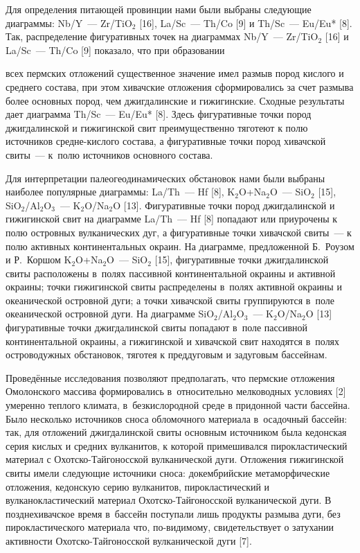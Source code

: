 Для определения питающей провинции нами были выбраны следующие диаграммы: Nb/Y~--- Zr/TiO$_2$ [16], La/Sc~--- Th/Co [9] и Th/Sc~--- Eu/Eu* [8]. Так, распределение фигуративных точек на диаграммах Nb/Y~--- Zr/TiO$_2$ [16] и La/Sc~--- Th/Co [9] показало, что при образовании

всех пермских отложений существенное значение имел размыв пород кислого и среднего состава, при этом хивачские отложения сформировались за счет размыва более основных пород, чем джигдалинские и гижигинские. Сходные результаты дает диаграмма Th/Sc~--- Eu/Eu* [8]. Здесь фигуративные точки пород джигдалинской и гижигинской свит преимущественно тяготеют к полю источников средне-кислого состава, а фигуративные точки пород хивачской свиты~--- к~полю источников основного состава.

Для интерпретации палеогеодинамических обстановок нами были выбраны наиболее популярные диаграммы: La/Th~--- Hf [8], K$_2$O+Na$_2$O~--- SiO$_2$ [15], SiO$_2$/Al$_2$O$_3$~--- K$_2$O/Na$_2$O [13]. Фигуративные точки пород джигдалинской и гижигинской свит на диаграмме La/Th~--- Hf [8] попадают или приурочены к полю островных вулканических дуг, а фигуративные точки хивачской свиты~--- к полю активных континентальных окраин. На диаграмме, предложенной Б.~Роузом и Р.~Коршом K$_2$O+Na$_2$O~--- SiO$_2$ [15], фигуративные точки джигдалинской свиты расположены в~полях пассивной континентальной окраины и активной окраины; точки гижигинской свиты распределены в~полях активной окраины и океанической островной дуги; а точки хивачской свиты группируются в~поле океанической островной дуги. На диаграмме SiO$_2$/Al$_2$O$_3$~--- K$_2$O/Na$_2$O [13] фигуративные точки джигдалинской свиты попадают в~поле пассивной континентальной окраины, а гижигинской и хивачской свит находятся в~полях островодужных обстановок, тяготея к преддуговым и задуговым бассейнам.

Проведённые исследования позволяют предполагать, что пермские отложения Омолонского массива формировались в~относительно мелководных условиях [2] умеренно теплого климата, в~безкислородной среде в придонной части
бассейна. Было несколько источников сноса обломочного материала в~осадочный бассейн: так, для отложений джигдалинской свиты основным источником была кедонская серия кислых и средних вулканитов, к которой примешивался пирокластический материал с Охотско-Тайгоносской вулканической дуги. Отложения гижигинской свиты имели следующие источники сноса: докембрийские метаморфические отложения, кедонскую серию вулканитов, пирокластический и вулканокластический материал Охотско-Тайгоносской вулканической дуги. В позднехивачское время в~бассейн поступали лишь продукты размыва дуги, без пирокластического материала что, по-видимому, свидетельствует о затухании активности Охотско-Тайгоносской вулканической дуги [7].


